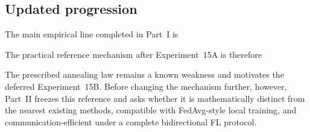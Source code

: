 \subsection{Updated progression}

The main empirical line completed in Part~I is
\begin{center}
\end{center}

The practical reference mechanism after Experiment~15A is therefore
\begin{center}
\end{center}
The prescribed annealing law remains a known weakness and motivates the deferred Experiment~15B. Before changing the mechanism further, however, Part~II freezes this reference and asks whether it is mathematically distinct from the nearest existing methods, compatible with FedAvg-style local training, and communication-efficient under a complete bidirectional FL protocol.
